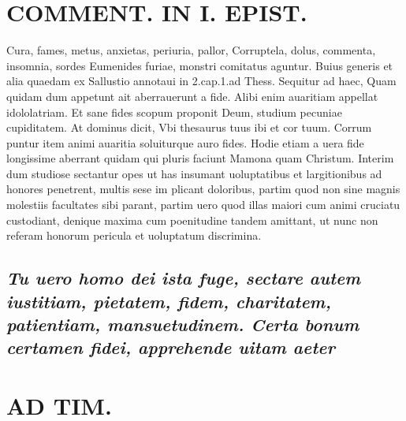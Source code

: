 \documentclass{article}
\begin{document}
\begin{pages}
\section*{COMMENT. IN I. EPIST. }\pstart Cura, fames, metus, anxietas, periuria, pallor, Corruptela, dolus, commenta, insomnia, sordes Eumenides furiae, monstri comitatus aguntur. Buius generis et alia quaedam ex Sallustio annotaui in 2.cap.1.ad Thess. Sequitur ad haec, Quam quidam dum appetunt ait aberrauerunt a fide. Alibi enim auaritiam appellat idololatriam. Et sane fides scopum proponit Deum, studium pecuniae cupiditatem. At dominus dicit, Vbi thesaurus tuus ibi et cor tuum. Corrum puntur item animi auaritia soluiturque auro fides. Hodie etiam a uera fide longissime aberrant quidam qui pluris faciunt Mamona quam Christum. Interim dum studiose sectantur opes ut has insumant uoluptatibus et largitionibus ad honores penetrent, multis sese im plicant doloribus, partim quod non sine magnis molestiis facultates sibi parant, partim uero quod illas maiori cum animi cruciatu custodiant, denique maxima cum poenitudine tandem amittant, ut nunc non referam honorum pericula et uoluptatum discrimina.  \pend
{}
{}
\subsection*{\textit{Tu uero homo dei ista fuge, sectare autem iustitiam, pietatem, fidem, charitatem, patientiam, mansuetudinem. Certa bonum certamen fidei, apprehende uitam aeter}}
\section*{AD TIM. }
\marginpar{[ p.170 ]}
{}

\end{pages}
\end{document}
